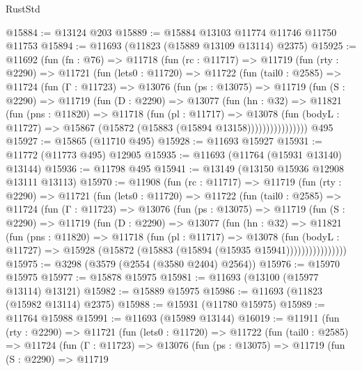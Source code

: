 \begin{lexlean}{RustStd}
\begin{coremodule}
@15884 := @13124 @203
@15889 := @15884 @13103 @11774 @11746 @11750 @11753
@15894 := @11693 (@11823 (@15889 @13109 @13114) @2375)
@15925 := @11692
    (fun (fn : @76) =>
    @11718
      (fun (rc : @11717) =>
      @11719
        (fun (rty : @2290) =>
        @11721
          (fun (lets0 : @11720) =>
          @11722
            (fun (tail0 : @2585) =>
            @11724
              (fun (Γ : @11723) =>
              @13076
                (fun (ps : @13075) =>
                @11719
                  (fun (S : @2290) =>
                  @11719
                    (fun (D : @2290) =>
                    @13077
                      (fun (hn : @32) =>
                      @11821
                        (fun (pns : @11820) =>
                        @11718
                          (fun (pl : @11717) =>
                          @13078
                            (fun (bodyL : @11727) =>
                            @15867 (@15872 (@15883 (@15894 @13158))))))))))))))))
    @495
@15927 := @15865 (@11710 @495)
@15928 := @11693 @15927
@15931 := @11772 (@11773 @495) @12905
@15935 := @11693 (@11764 (@15931 @13140) @13144)
@15936 := @11798 @495
@15941 := @13149 (@13150 @15936 @12908 @13111 @13113)
@15970 := @11908
    (fun (rc : @11717) =>
    @11719
      (fun (rty : @2290) =>
      @11721
        (fun (lets0 : @11720) =>
        @11722
          (fun (tail0 : @2585) =>
          @11724
            (fun (Γ : @11723) =>
            @13076
              (fun (ps : @13075) =>
              @11719
                (fun (S : @2290) =>
                @11719
                  (fun (D : @2290) =>
                  @13077
                    (fun (hn : @32) =>
                    @11821
                      (fun (pns : @11820) =>
                      @11718
                        (fun (pl : @11717) =>
                        @13078
                          (fun (bodyL : @11727) =>
                          @15928 (@15872 (@15883 (@15894 (@15935 @15941))))))))))))))))
@15975 := @3298 (@3579 (@2554 (@3580 @2404) @2564))
@15976 := @15970 @15975
@15977 := @15878 @15975
@15981 := @11693 (@13100 (@15977 @13114) @13121)
@15982 := @15889 @15975
@15986 := @11693 (@11823 (@15982 @13114) @2375)
@15988 := @15931 (@11780 @15975)
@15989 := @11764 @15988
@15991 := @11693 (@15989 @13144)
@16019 := @11911
    (fun (rty : @2290) =>
    @11721
      (fun (lets0 : @11720) =>
      @11722
        (fun (tail0 : @2585) =>
        @11724
          (fun (Γ : @11723) =>
          @13076
            (fun (ps : @13075) =>
            @11719
              (fun (S : @2290) =>
              @11719

\end{coremodule}
\end{lexlean}
